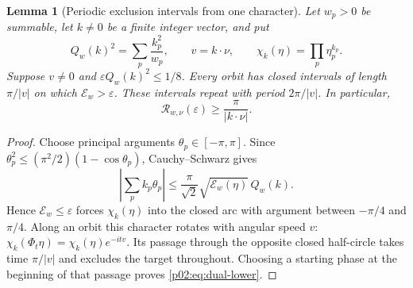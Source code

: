 \documentclass[11pt,letterpaper]{article}
\newtheorem{lemma}[theorem]{Lemma}
\theoremstyle{definition}
\theoremstyle{remark}
\newcommand{\eps}{\varepsilon}
\newcommand{\1}{\mathbf 1}
\begin{document}
\begin{lemma}[Periodic exclusion intervals from one character]
\label{p02:lem:character-obstruction}
Let $w_p>0$ be summable, let $k\ne0$ be a finite integer vector, and
put
\[
 Q_w(k)^2=\sum_p\frac{k_p^2}{w_p},\qquad
 v=k\cdot\nu,\qquad \chi_k(\eta)=\prod_p\eta_p^{k_p}.
\]
Suppose $v\ne0$ and $\eps Q_w(k)^2\le1/8$. Every orbit has closed
intervals of length $\pi/|v|$ on which $\mathcal E_w>\eps$. These intervals
repeat with period $2\pi/|v|$. In particular,
\begin{equation}\label{p02:eq:dual-lower}
 \mathcal R_{w,\nu}(\eps)\ge\frac\pi{|k\cdot\nu|}.
\end{equation}
\end{lemma}
\begin{proof}
Choose principal arguments $\theta_p\in[-\pi,\pi]$. Since
$\theta_p^2\le(\pi^2/2)(1-\cos\theta_p)$, Cauchy--Schwarz gives
\[
 \left|\sum_p k_p\theta_p\right|
 \le\frac\pi{\sqrt2}\sqrt{\mathcal E_w(\eta)}\,Q_w(k).
\]
Hence $\mathcal E_w\le\eps$ forces $\chi_k(\eta)$ into the closed arc with
argument between $-\pi/4$ and $\pi/4$. Along an orbit this character
rotates with angular speed $v$:
$\chi_k(\Phi_t\eta)=\chi_k(\eta)e^{-itv}$.
Its passage through the opposite closed half-circle takes time
$\pi/|v|$ and excludes the target throughout. Choosing a starting
phase at the beginning of that passage proves \eqref{p02:eq:dual-lower}.
\end{proof}
\end{document}
